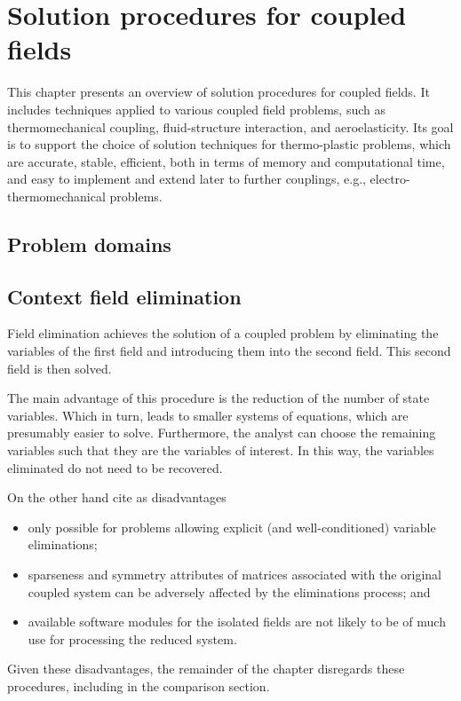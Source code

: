 
\chapter{Solution procedures for coupled fields}

This chapter presents an overview of solution procedures for coupled fields.
It includes techniques applied to various coupled field problems, such as thermomechanical coupling, fluid-structure interaction, and aeroelasticity.
Its goal is to support the choice of solution techniques for thermo-plastic problems, which are accurate, stable, efficient, both in terms of memory and computational time, and easy to implement and extend later to further couplings, e.g., electro\--thermomechanical problems.

\section{Problem domains}

\section{Context field elimination}

Field elimination achieves the solution of a coupled problem by eliminating the variables of the first field and introducing them into the second field.
This second field is then solved. \citep{danowski_computational_2014}

The main advantage of this procedure is the reduction of the number of state variables.
Which in turn, leads to smaller systems of equations, which are presumably easier to solve.
Furthermore, the analyst can choose the remaining variables such that they are the variables of interest.
In this way, the variables eliminated do not need to be recovered. \citep{felippa_staggered_1980}

On the other hand \cite{felippa_staggered_1980} cite as disadvantages
\begin{itemize}
  \item only possible for problems allowing explicit (and well-conditioned) variable eliminations;
  \item sparseness and symmetry attributes of matrices associated with the original coupled system can be adversely affected by the eliminations process; and
  \item available software modules for the isolated fields are not likely to be of much use for processing the reduced system.
\end{itemize}
Given these disadvantages, the remainder of the chapter disregards these procedures, including in the comparison section.

